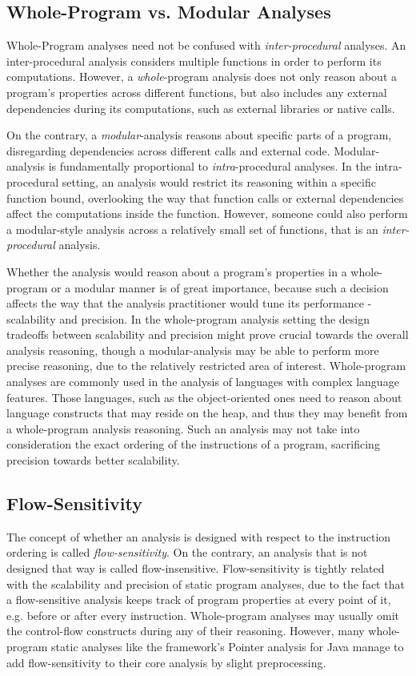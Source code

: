 \subsection{Whole-Program vs. Modular Analyses}

Whole-Program analyses need not be confused with \emph{inter-procedural} analyses.
An inter-procedural analysis considers multiple functions in order to perform
its computations. However, a \emph{whole}-program analysis does not only reason
about a program's properties across different functions, but also includes any
external dependencies during its computations, such as external libraries or
native calls.

On the contrary, a \emph{modular}-analysis reasons about specific parts of a
program, disregarding dependencies across different calls and external code.
Modular-analysis is fundamentally proportional to \emph{intra}-procedural analyses.
In the intra-procedural setting, an analysis would restrict its reasoning within
a specific function bound, overlooking the way that function calls or external
dependencies affect the computations inside the function. However, someone could
also perform a modular-style analysis across a relatively small set of functions,
that is an \emph{inter-procedural} analysis.

Whether the analysis would reason about a program's properties in a whole-program
or a modular manner is of great importance, because such a decision affects the
way that the analysis practitioner would tune its performance - scalability and
precision. In the whole-program analysis setting the design tradeoffs between
scalability and precision might prove crucial towards the overall analysis
reasoning, though a modular-analysis may be able to perform more precise reasoning,
due to the relatively restricted area of interest. Whole-program analyses are
commonly used in the analysis of languages with complex language features. Those
languages, such as the object-oriented ones need to reason about language constructs
that may reside on the heap, and thus they may benefit from a whole-program analysis
reasoning. Such an analysis may not take into consideration the
exact ordering of the instructions of a program, sacrificing precision towards
better scalability.

\subsection{Flow-Sensitivity}

The concept of whether an analysis is designed with respect to
the instruction ordering is called \emph{flow-sensitivity}.
On the contrary, an analysis that is not designed that way is
called flow-insensitive. Flow-sensitivity is tightly related with
the scalability and precision of static program analyses, due to the
fact that a flow-sensitive analysis keeps track of program properties
at every point of it, e.g. before or after every instruction.
Whole-program analyses may usually omit the control-flow constructs
during any of their reasoning. However, many whole-program static
analyses like the \doop{} framework's Pointer analysis for Java
manage to add flow-sensitivity to their core analysis by slight
preprocessing\cite{points-to15}.

